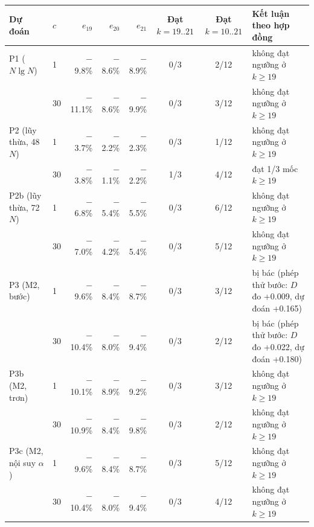 \begin{tabularx}{\linewidth}{llrrrccX}
\toprule
Dự đoán & $c$ & $e_{19}$ & $e_{20}$ & $e_{21}$ & \makecell{Đạt \\ $k{=}19..21$} & \makecell{Đạt \\ $k{=}10..21$} & Kết luận theo hợp đồng \\
\midrule
P1 ($N\lg N$) & 1 & $-$9.8\% & $-$8.6\% & $-$8.9\% & 0/3 & 2/12 & không đạt ngưỡng ở $k\ge19$ \\
 & 30 & $-$11.1\% & $-$8.6\% & $-$9.9\% & 0/3 & 3/12 & không đạt ngưỡng ở $k\ge19$ \\
\addlinespace
P2 (lũy thừa, 48 $N$) & 1 & $-$3.7\% & $-$2.2\% & $-$2.3\% & 0/3 & 1/12 & không đạt ngưỡng ở $k\ge19$ \\
 & 30 & $-$3.8\% & $-$1.1\% & $-$2.2\% & 1/3 & 4/12 & đạt 1/3 mốc $k\ge19$ \\
\addlinespace
P2b (lũy thừa, 72 $N$) & 1 & $-$6.8\% & $-$5.4\% & $-$5.5\% & 0/3 & 6/12 & không đạt ngưỡng ở $k\ge19$ \\
 & 30 & $-$7.0\% & $-$4.2\% & $-$5.4\% & 0/3 & 5/12 & không đạt ngưỡng ở $k\ge19$ \\
\addlinespace
P3 (M2, bước) & 1 & $-$9.6\% & $-$8.4\% & $-$8.7\% & 0/3 & 3/12 & bị bác (phép thử bước: $D$ đo +0.009, dự đoán +0.165) \\
 & 30 & $-$10.4\% & $-$8.0\% & $-$9.4\% & 0/3 & 2/12 & bị bác (phép thử bước: $D$ đo +0.022, dự đoán +0.180) \\
\addlinespace
P3b (M2, trơn) & 1 & $-$10.1\% & $-$8.9\% & $-$9.2\% & 0/3 & 3/12 & không đạt ngưỡng ở $k\ge19$ \\
 & 30 & $-$10.9\% & $-$8.4\% & $-$9.8\% & 0/3 & 2/12 & không đạt ngưỡng ở $k\ge19$ \\
\addlinespace
P3c (M2, nội suy $\alpha$) & 1 & $-$9.6\% & $-$8.4\% & $-$8.7\% & 0/3 & 5/12 & không đạt ngưỡng ở $k\ge19$ \\
 & 30 & $-$10.4\% & $-$8.0\% & $-$9.4\% & 0/3 & 4/12 & không đạt ngưỡng ở $k\ge19$ \\
\bottomrule
\end{tabularx}
